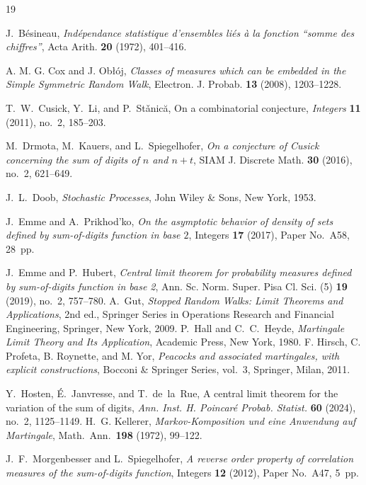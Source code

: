 \documentclass[10pt]{amsart}
\theoremstyle{definition}
\numberwithin{equation}{section}
\begin{document}
\begin{thebibliography}{19}


J.~B\'esineau,
\emph{Ind\'ependance statistique d'ensembles li\'es \`a la fonction ``somme des chiffres''},
Acta Arith. \textbf{20} (1972), 401--416.

 A. M. G. Cox and J. Ob{\l}{\'o}j,
\emph{Classes of measures which can be embedded in the Simple Symmetric
Random Walk},
Electron. J. Probab. \textbf{13} (2008), 1203--1228.

T.~W.~Cusick, Y.~Li, and P.~St\v{a}nic\u{a},
On a combinatorial conjecture,
\emph{Integers} \textbf{11} (2011), no.~2, 185--203.



M.~Drmota, M.~Kauers, and L.~Spiegelhofer,
\emph{On a conjecture of {C}usick concerning the sum of digits of $n$ and $n + t$},
SIAM J. Discrete Math. \textbf{30} (2016), no.~2, 621--649.

J.~L.~Doob,
\emph{Stochastic Processes},
John Wiley \& Sons, New York, 1953.

J.~Emme and A.~Prikhod'ko,
\emph{On the asymptotic behavior of density of sets defined by sum-of-digits function in base $2$},
Integers \textbf{17} (2017), Paper No.~A58, 28~pp.

J.~Emme and P.~Hubert,
\emph{Central limit theorem for probability measures
defined by sum-of-digits function in base 2},
Ann. Sc. Norm. Super. Pisa Cl. Sci. (5) \textbf{19} (2019),
no.~2, 757--780.
A.~Gut,
\emph{Stopped Random Walks: Limit Theorems and Applications},
2nd ed.,
Springer Series in Operations Research and Financial Engineering,
Springer, New York, 2009.
P.~Hall and C.~C.~Heyde,
\emph{Martingale Limit Theory and Its Application},
Academic Press, New York, 1980.
F. Hirsch, C. Profeta, B. Roynette, and M. Yor, \emph{Peacocks and associated
martingales, with explicit constructions}, Bocconi \& Springer Series, vol.~3,
Springer, Milan, 2011.


Y.~Hosten, \'E.~Janvresse, and T.~de~la~Rue,
A central limit theorem for the variation of the sum of digits,
\emph{Ann. Inst. H. Poincar\'e Probab. Statist.} \textbf{60} (2024), no.~2, 1125--1149.
H.~G. Kellerer,
\emph{Markov-Komposition und eine Anwendung auf Martingale},
Math.\ Ann.\ \textbf{198} (1972), 99--122.

J.~F.~Morgenbesser and L.~Spiegelhofer,
\emph{A reverse order property of correlation measures of the sum-of-digits function},
Integers \textbf{12} (2012), Paper No.~A47, 5~pp.



\end{thebibliography}
\end{document}
